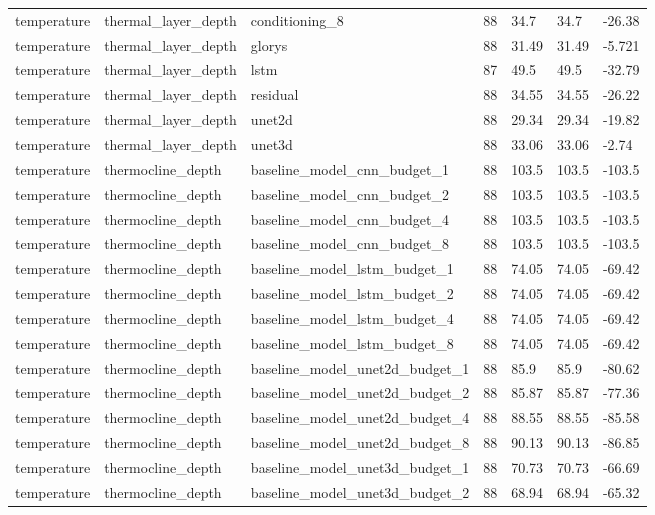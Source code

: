 \begin{table}[htbp]
\begin{tabular}{lllllll}
temperature & thermal\_layer\_depth & conditioning\_8 & 88 & 34.7 & 34.7 & -26.38 \\
temperature & thermal\_layer\_depth & glorys & 88 & 31.49 & 31.49 & -5.721 \\
temperature & thermal\_layer\_depth & lstm & 87 & 49.5 & 49.5 & -32.79 \\
temperature & thermal\_layer\_depth & residual & 88 & 34.55 & 34.55 & -26.22 \\
temperature & thermal\_layer\_depth & unet2d & 88 & 29.34 & 29.34 & -19.82 \\
temperature & thermal\_layer\_depth & unet3d & 88 & 33.06 & 33.06 & -2.74 \\
temperature & thermocline\_depth & baseline\_model\_cnn\_budget\_1 & 88 & 103.5 & 103.5 & -103.5 \\
temperature & thermocline\_depth & baseline\_model\_cnn\_budget\_2 & 88 & 103.5 & 103.5 & -103.5 \\
temperature & thermocline\_depth & baseline\_model\_cnn\_budget\_4 & 88 & 103.5 & 103.5 & -103.5 \\
temperature & thermocline\_depth & baseline\_model\_cnn\_budget\_8 & 88 & 103.5 & 103.5 & -103.5 \\
temperature & thermocline\_depth & baseline\_model\_lstm\_budget\_1 & 88 & 74.05 & 74.05 & -69.42 \\
temperature & thermocline\_depth & baseline\_model\_lstm\_budget\_2 & 88 & 74.05 & 74.05 & -69.42 \\
temperature & thermocline\_depth & baseline\_model\_lstm\_budget\_4 & 88 & 74.05 & 74.05 & -69.42 \\
temperature & thermocline\_depth & baseline\_model\_lstm\_budget\_8 & 88 & 74.05 & 74.05 & -69.42 \\
temperature & thermocline\_depth & baseline\_model\_unet2d\_budget\_1 & 88 & 85.9 & 85.9 & -80.62 \\
temperature & thermocline\_depth & baseline\_model\_unet2d\_budget\_2 & 88 & 85.87 & 85.87 & -77.36 \\
temperature & thermocline\_depth & baseline\_model\_unet2d\_budget\_4 & 88 & 88.55 & 88.55 & -85.58 \\
temperature & thermocline\_depth & baseline\_model\_unet2d\_budget\_8 & 88 & 90.13 & 90.13 & -86.85 \\
temperature & thermocline\_depth & baseline\_model\_unet3d\_budget\_1 & 88 & 70.73 & 70.73 & -66.69 \\
temperature & thermocline\_depth & baseline\_model\_unet3d\_budget\_2 & 88 & 68.94 & 68.94 & -65.32 \\

\end{tabular}
\end{table}
